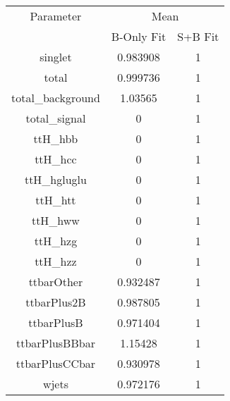 \begin{table}
\centering
\begin{tabular}{ccc}
\toprule
Parameter & \multicolumn{2}{c}{Mean}\\
 & B-Only Fit & S+B Fit\\
\midrule
singlet & \num{0.983908} & \num{1}\\
total & \num{0.999736} & \num{1}\\
total\_background & \num{1.03565} & \num{1}\\
total\_signal & \num{0} & \num{1}\\
ttH\_hbb & \num{0} & \num{1}\\
ttH\_hcc & \num{0} & \num{1}\\
ttH\_hgluglu & \num{0} & \num{1}\\
ttH\_htt & \num{0} & \num{1}\\
ttH\_hww & \num{0} & \num{1}\\
ttH\_hzg & \num{0} & \num{1}\\
ttH\_hzz & \num{0} & \num{1}\\
ttbarOther & \num{0.932487} & \num{1}\\
ttbarPlus2B & \num{0.987805} & \num{1}\\
ttbarPlusB & \num{0.971404} & \num{1}\\
ttbarPlusBBbar & \num{1.15428} & \num{1}\\
ttbarPlusCCbar & \num{0.930978} & \num{1}\\
wjets & \num{0.972176} & \num{1}\\
\bottomrule
\end{tabular}
\end{table}